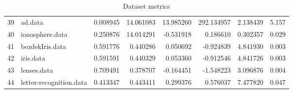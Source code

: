 \begin{table}
{\begin{tabular}{|l|l|rrrrrr|}
39 &                                  ad.data &       0.008945 &              14.061083 &  13.985260 &  292.134957 &  2.138439 &        5.157 \\
40 &                          ionosphere.data &       0.250876 &              14.014291 &  -0.531918 &    0.186610 &  0.302357 &        0.029 \\
41 &                          bezdekIris.data &       0.591776 &               0.440286 &   0.050692 &   -0.924839 &  4.841930 &        0.003 \\
42 &                                iris.data &       0.591591 &               0.440329 &   0.053360 &   -0.912546 &  4.841726 &        0.003 \\
43 &                              lenses.data &       0.709491 &               0.378707 &  -0.164451 &   -1.548223 &  3.096876 &        0.004 \\
44 &                  letter-recognition.data &       0.413347 &               0.443411 &   0.299376 &    0.576037 &  7.477820 &        0.047 \\
\bottomrule
\end{tabular}}
\caption{Dataset metrics}
\end{table}
